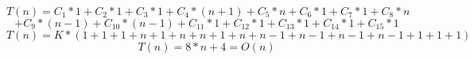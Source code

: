 \begin{equation}
T(n) = C_1*1 + C_2*1 + C_3*1 + C_4*(n+1) + C_5*n + C_6*1+ C_7*1 + C_8*n
\end{equation}
\begin{equation}
+ C_9*(n-1) + C_10*(n-1) + C_11*1 + C_12*1 + C_13*1 +  C_14*1 + C_15*1
\end{equation}
\begin{equation}
    T(n)= K*(1 + 1 + 1 + n+1 + n + n + 1 + n + n-1 + n-1 + n-1 + n-1 + 1 + 1 + 1)
    \end{equation}
    \begin{equation}
    T(n)= 8*n + 4 =O(n)
    \end{equation}
\begin{center}
\begin{minipage}{0.5\textwidth}
    
\end{minipage}
\end{center}


    
    \newpage
